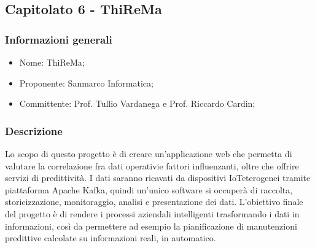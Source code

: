 \subsection{Capitolato 6 - ThiReMa}
\subsubsection{Informazioni generali}
\begin{itemize}
	\item Nome: ThiReMa;
	\item Proponente: Sanmarco Informatica;
	\item Committente: Prof. Tullio Vardanega e Prof. Riccardo Cardin;
\end{itemize}
\subsubsection{Descrizione}
Lo scopo di questo progetto è di creare un'applicazione web che permetta di valutare la correlazione fra dati operativi\glosp e fattori influenzanti\glo, oltre che offrire servizi di predittività. I dati saranno ricavati da dispositivi IoT\glosp eterogenei tramite piattaforma Apache Kafka\glo, quindi un'unico software si occuperà di raccolta, storicizzazione, monitoraggio, analisi e presentazione dei dati.
L'obiettivo finale del progetto è di rendere i processi aziendali intelligenti trasformando i dati in informazioni, così da permettere ad esempio la pianificazione di manutenzioni predittive calcolate su informazioni reali, in automatico.

